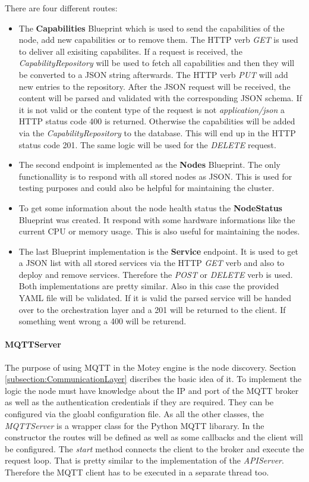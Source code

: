 There are four different routes:
\begin{itemize}
  \item The \textbf{Capabilities} Blueprint which is used to send the capabilities of the node, add new capabilities or to remove them.
  The \ac{HTTP} verb \textit{GET} is used to deliver all exisiting capabilites.
  If a request is received, the \textit{CapabilityRepository} will be used to fetch all capabilities and then they will be converted to a JSON string afterwards.
  The \ac{HTTP} verb \textit{PUT} will add new entries to the repository.
  After the \ac{JSON} request will be received, the content will be parsed and validated with the corresponding \ac{JSON} schema.
  If it is not valid or the content type of the request is not \textit{application/json} a \ac{HTTP} status code 400 is returned.
  Otherwise the capabilities will be added via the \textit{CapabilityRepository} to the database.
  This will end up in the \ac{HTTP} status code 201.
  The same logic will be used for the \textit{DELETE} request.
  \item The second endpoint is implemented as the \textbf{Nodes} Blueprint.
  The only functionallity is to respond with all stored nodes as \ac{JSON}.
  This is used for testing purposes and could also be helpful for maintaining the cluster.
  \item To get some information about the node health status the \textbf{NodeStatus} Blueprint was created.
  It respond with some hardware informations like the current \ac{CPU} or memory usage.
  This is also useful for maintaining the nodes.
  \item The last Blueprint implementation is the \textbf{Service} endpoint.
  It is used to get a \ac{JSON} list with all stored services via the \ac{HTTP} \textit{GET} verb and also to deploy and remove services.
  Therefore the \textit{POST} or \textit{DELETE} verb is used.
  Both implementations are pretty similar.
  Also in this case the provided \ac{YAML} file will be validated.
  If it is valid the parsed service will be handed over to the orchestration layer and a 201 will be returned to the client.
  If something went wrong a 400 will be returend.
\end{itemize}

\paragraph{MQTTServer}
The purpose of using \ac{MQTT} in the Motey engine is the node discovery.
Section \ref{subsection:CommunicationLayer} discribes the basic idea of it.
To implement the logic the node must have knowledge about the \ac{IP} and port of the \ac{MQTT} broker as well as the authentication credentials if they are required.
They can be configured via the gloabl configuration file.
As all the other classes, the \textit{MQTTServer} is a wrapper class for the Python \ac{MQTT} libarary.
In the constructor the routes will be defined as well as some callbacks and the client will be configured.
The \textit{start} method connects the client to the broker and execute the request loop.
That is pretty similar to the implementation of the \textit{APIServer}.
Therefore the \ac{MQTT} client has to be executed in a separate thread too.

